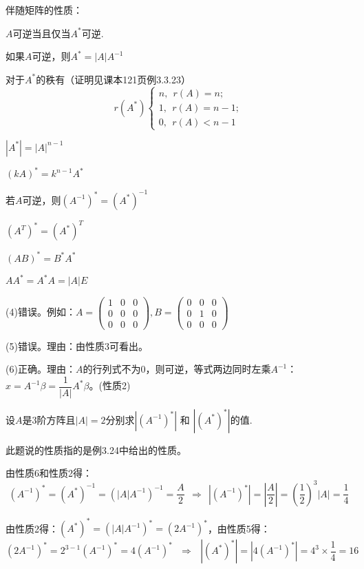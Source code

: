 \documentclass[a4paper]{report}
\begin{document}
\begin{tips}
伴随矩阵的性质：

\begin{asparaenum}[(1)]
\item $A$可逆当且仅当$A^*$可逆.
\item 如果$A$可逆，则$A^*=|A|A^{-1}$
\item 对于$A^*$的秩有（证明见课本121页例3.3.23）
\begin{equation*}
r(A^*)
  \begin{cases}
    n,~~r(A)=n;\\
    1,~~r(A)=n-1;\\
    0,~~r(A)<n-1
  \end{cases}
\end{equation*}
\item $|A^*|=|A|^{n-1}$
\item $(kA)^*=k^{n-1}A^*$
\item 若$A$可逆，则$(A^{-1})^*=(A^*)^{-1}$
\item $(A^T)^*=(A^*)^T$
\item $(AB)^*=B^*A^*$
\item $AA^*=A^*A=|A|E$
\end{asparaenum}
\hphantom{.}
\end{tips}

\begin{jie}
(4)错误。例如：$A=
\begin{pmatrix}
1&0&0\\
0&0&0\\
0&0&0
\end{pmatrix},B=\begin{pmatrix}
0&0&0\\
0&1&0\\
0&0&0
\end{pmatrix}
$

(5)错误。理由：由性质3可看出。

(6)正确。理由：$A$的行列式不为0，则可逆，等式两边同时左乘$A^{-1}$：$x=A^{-1}\beta=\dfrac{1}{|A|}A^*\beta$。(性质2)
\end{jie}

\EX 设$A$是$3$阶方阵且$|A|=2$分别求$|(A^{-1})^*|$ 和
$|(A^*)^*|$的值.

\begin{jie}
此题说的性质指的是例3.24中给出的性质。

由性质6和性质2得：
\begin{equation*}
(A^{-1})^*=(A^*)^{-1}=(|A|A^{-1})^{-1}=\frac{A}{2}~~\Rightarrow~~|(A^{-1})^*|=\left|\frac{A}{2}\right|=\left(\frac{1}{2}\right)^3|A|=\frac{1}{4}
\end{equation*}

由性质2得：$(A^*)^*=(|A|A^{-1})^*=(2A^{-1})^*$，由性质5得：
\begin{equation*}
  (2A^{-1})^*=2^{3-1}(A^{-1})^*=4(A^{-1})^*~~~\Rightarrow~~~|(A^*)^*|=|4(A^{-1})^*|=4^3\times\frac{1}{4}=16
\end{equation*}
\end{jie}
\end{document}
